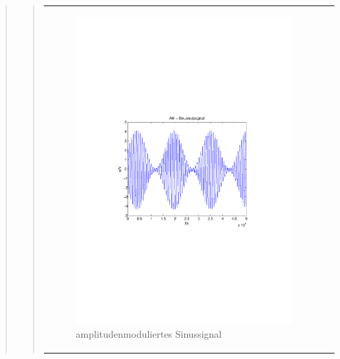 \begin{quote}
\begin{quote}
\begin{center}
\begin{tabular}{ll}
\begin{minipage}{0.6\textwidth}
                    \begin{figure}[H]
                        \label{fig:}
                        \includegraphics[scale=0.5, trim = 2cm 6.5cm 1.5cm
                        8.5cm, clip]{./Bilder/am-sinus} %
                        \caption{amplitudenmoduliertes Sinussignal}
                    \end{figure}

                \end{minipage}
                \begin{minipage}{0.6\textwidth}


\end{minipage}
\end{tabular}
\end{center}
\end{quote}
\end{quote}
